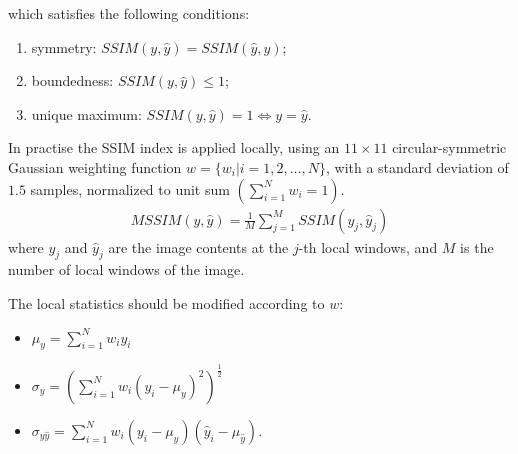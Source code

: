 which satisfies the following conditions:
\begin{enumerate}
\item symmetry: $SSIM(y, \hat{y}) = SSIM(\hat{y}, y)$;
\item boundedness: $SSIM(y, \hat{y}) \leq 1$;
\item unique maximum: $SSIM(y, \hat{y}) = 1 \iff y = \hat{y}$.
\end{enumerate}

In practise the SSIM index is applied locally, using an $11\times11$ circular-symmetric Gaussian weighting function $w = \{w_i | i = 1, 2, \dots, N\}$, with a standard deviation of $1.5$ samples, normalized to unit sum $\left( \sum^{N}_{i=1} w_i = 1 \right)$.
\begin{align}
    MSSIM(y, \hat{y}) =  \frac{1}{M} \sum^{M}_{j=1} SSIM(y_j, \hat{y}_j)
\end{align}
where $y_j$ and $\hat{y}_j$ are the image contents at the $j$-th local windows, and $M$ is the number of local windows of the image.

The local statistics should be modified according to $w$:
\begin{itemize}
\item $ \mu_{y} = \sum^{N}_{i = 1} w_i y_i $
\item $ \sigma_{y} = \left( \sum^{N}_{i = 1} w_i (y_i - \mu_y)^2 \right) ^ {\frac{1}{2}} $
\item $ \sigma_{y \hat{y}} = \sum^{N}_{i = 1} w_i (y_i - \mu_y) (\hat{y}_i - \mu_{\hat{y}}) $.
\end{itemize}
